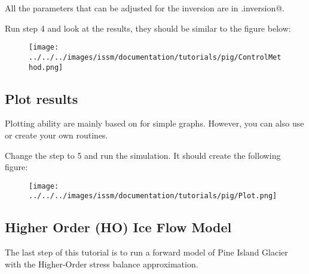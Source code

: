 All the parameters that can be adjusted for the inversion are in \verb@md.inversion@.

Run step 4 and look at the results, they should be similar to the figure below:
\begin{figure}[H]
	\begin{center}
		\texttt{[image: ../../../images/issm/documentation/tutorials/pig/ControlMethod.png]}
	\end{center}
\end{figure}
\subsection{Plot results}%
Plotting ability are mainly based on \verb@plotmodel@ for simple graphs. However, you can also use or create your own routines.

Change the step to 5 and run the simulation. It should create the following figure:
\begin{figure}[H]
	\begin{center}
		\texttt{[image: ../../../images/issm/documentation/tutorials/pig/Plot.png]}
	\end{center}
\end{figure}
\subsection{Higher Order (HO) Ice Flow Model}%
The last step of this tutorial is to run a forward model of Pine Island Glacier with the Higher-Order stress balance approximation.

